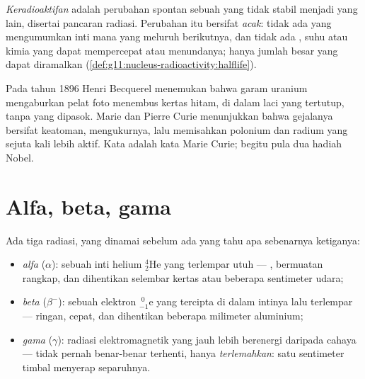 \begin{definition}[Keradioaktifan]\label{def:g11:nucleus-radioactivity:radioactivity}
\emph{Keradioaktifan} adalah perubahan spontan sebuah
 yang tidak stabil menjadi  yang lain, disertai pancaran
radiasi. Perubahan itu bersifat \emph{acak}: tidak ada yang mengumumkan inti
mana yang meluruh berikutnya, dan tidak ada , suhu atau kimia yang
dapat mempercepat atau menundanya; hanya jumlah besar yang dapat diramalkan
(\cref{def:g11:nucleus-radioactivity:halflife}).
\end{definition}

\begin{remark}\label{rem:g11:nucleus-radioactivity:curie}
Pada tahun 1896 Henri Becquerel menemukan bahwa garam uranium mengaburkan
pelat foto menembus kertas hitam, di dalam laci yang tertutup, tanpa 
yang dipasok. Marie dan Pierre Curie menunjukkan bahwa gejalanya bersifat
keatoman, mengukurnya, lalu memisahkan polonium dan radium yang sejuta kali
lebih aktif. Kata \emph{} adalah kata Marie Curie; begitu pula
dua hadiah Nobel.
\end{remark}

\section{Alfa, beta, gama}

\begin{definition}\label{def:g11:nucleus-radioactivity:abg}
Ada tiga radiasi, yang dinamai sebelum ada yang tahu apa sebenarnya
ketiganya:
\begin{itemize}
  \item \emph{alfa} ($\alpha$): sebuah inti helium
        ${}^{4}_{2}\mathrm{He}$ yang terlempar utuh --- , bermuatan
        rangkap, dan dihentikan selembar kertas atau beberapa sentimeter
        udara;
  \item \emph{beta} ($\beta^-$): sebuah elektron
        ${}^{\;0}_{-1}\mathrm{e}$ yang tercipta di dalam intinya lalu
        terlempar --- ringan, cepat, dan dihentikan beberapa milimeter
        aluminium;
  \item \emph{gama} ($\gamma$): radiasi
        elektromagnetik yang jauh lebih berenergi daripada cahaya --- tidak
        pernah benar-benar terhenti, hanya
        \emph{terlemahkan}: satu sentimeter timbal
        menyerap separuhnya.
\end{itemize}
\end{definition}

